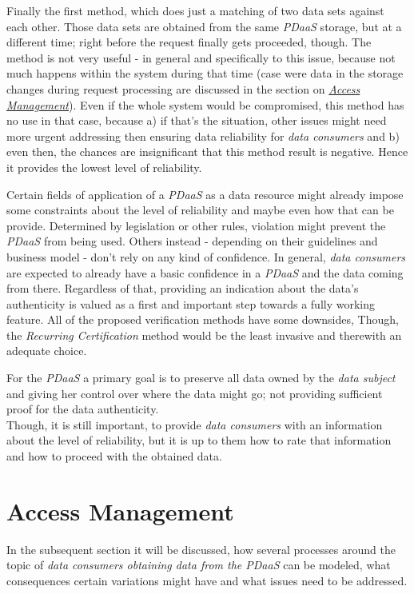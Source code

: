 \documentclass[12pt,english,a4paper,titlepage,cleardoublepage=empty,dottedtoc]{report}
\begin{document}
Finally the first method, which does just a matching of two data sets
against each other. Those data sets are obtained from the same
\emph{PDaaS} storage, but at a different time; right before the request
finally gets proceeded, though. The method is not very useful - in
general and specifically to this issue, because not much happens within
the system during that time (case were data in the storage changes
during request processing are discussed in the section on
\emph{\protect\hyperlink{access-management}{Access Management}}). Even
if the whole system would be compromised, this method has no use in that
case, because a) if that's the situation, other issues might need more
urgent addressing then ensuring data reliability for \emph{data
consumers} and b) even then, the chances are insignificant that this
method result is negative. Hence it provides the lowest level of
reliability.

Certain fields of application of a \emph{PDaaS} as a data resource might
already impose some constraints about the level of reliability and maybe
even how that can be provide. Determined by legislation or other rules,
violation might prevent the \emph{PDaaS} from being used. Others instead
- depending on their guidelines and business model - don't rely on any
kind of confidence. In general, \emph{data consumers} are expected to
already have a basic confidence in a \emph{PDaaS} and the data coming
from there. Regardless of that, providing an indication about the data's
authenticity is valued as a first and important step towards a fully
working feature. All of the proposed verification methods have some
downsides, Though, the \emph{Recurring Certification} method would be
the least invasive and therewith an adequate choice.

For the \emph{PDaaS} a primary goal is to preserve all data owned by the
\emph{data subject} and giving her control over where the data might go;
not providing sufficient proof for the data authenticity.\\
Though, it is still important, to provide \emph{data consumers} with an
information about the level of reliability, but it is up to them how to
rate that information and how to proceed with the obtained data.

\hypertarget{access-management}{\section{Access
Management}\label{access-management}}

In the subsequent section it will be discussed, how several processes
around the topic of \emph{data consumers obtaining data from the PDaaS}
can be modeled, what consequences certain variations might have and what
issues need to be addressed.
\end{document}
